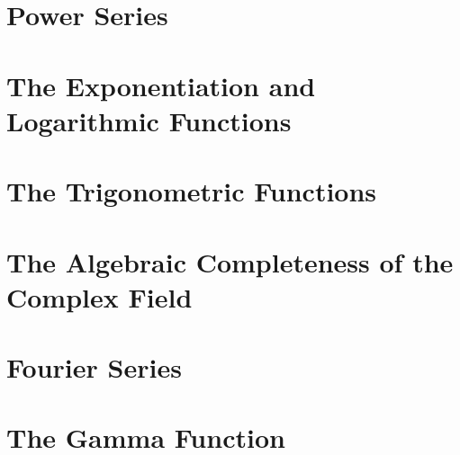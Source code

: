 
\section{Power Series}\label{sec:power-series}


\section{The Exponentiation and Logarithmic Functions}\label{sec:the-exponentiation-and-logarithmic-functions}


\section{The Trigonometric Functions}\label{sec:the-trigonometric-functions}


\section{The Algebraic Completeness of the Complex Field}\label{sec:the-algebraic-completeness-of-the-complex-field}


\section{Fourier Series}\label{sec:fourier-series}


\section{The Gamma Function}\label{sec:the-gamma-function}

